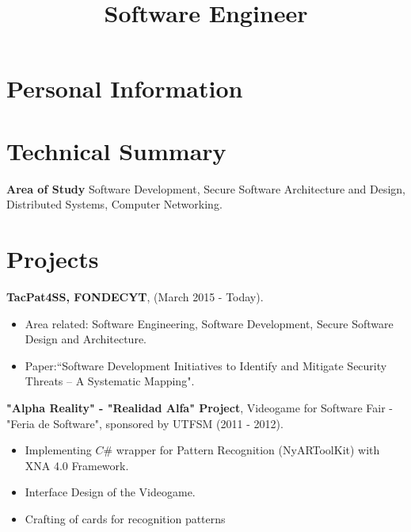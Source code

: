 \documentclass[10pt,a4paper,sans]{moderncv}        %
\title{Software Engineer}
\begin{document}
\makecvtitle


\section{Personal Information}

\section{Technical Summary}
    \vspace{1 mm}
    \textbf{Area of Study} \-\hspace{0.15cm}Software Development, Secure Software Architecture and Design, Distributed Systems, Computer Networking.

\section{Projects}
\textbf{TacPat4SS, FONDECYT}, (March 2015 - Today).
\begin{itemize}
	\item Area related: Software Engineering, Software Development, Secure Software Design and Architecture.
	\item Paper:``Software Development Initiatives to Identify and Mitigate Security Threats – A Systematic Mapping".
\end{itemize}
\vspace{3 mm}
\textbf{"Alpha Reality" - "Realidad Alfa" Project}, Videogame for Software Fair - "Feria de Software", sponsored by UTFSM (2011 - 2012).
\begin{itemize}
	\item Implementing \(C\#\) wrapper for Pattern Recognition (NyARToolKit) with XNA 4.0 Framework.
	\item Interface Design of the Videogame.
	\item Crafting of cards for recognition patterns
\end{itemize}
\end{document}
